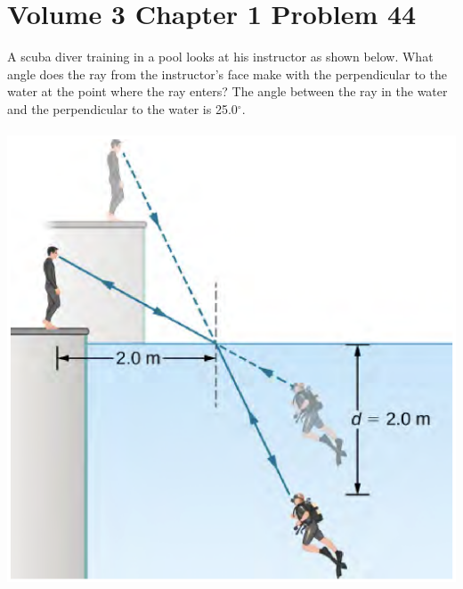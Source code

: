 \documentclass[11pt]{article}
\begin{document}
 \section*{Volume 3 Chapter 1 Problem 44}
  A scuba diver training in a pool looks at his instructor as shown below. What angle 
  does the ray from the instructor’s face make with the perpendicular to the water at 
  the point where the ray enters? The angle between the ray in the water and the 
  perpendicular to the water is 25.0\(^\circ\). \\\\
  \includegraphics[scale=0.4]{3-1-44.png}
\end{document}
